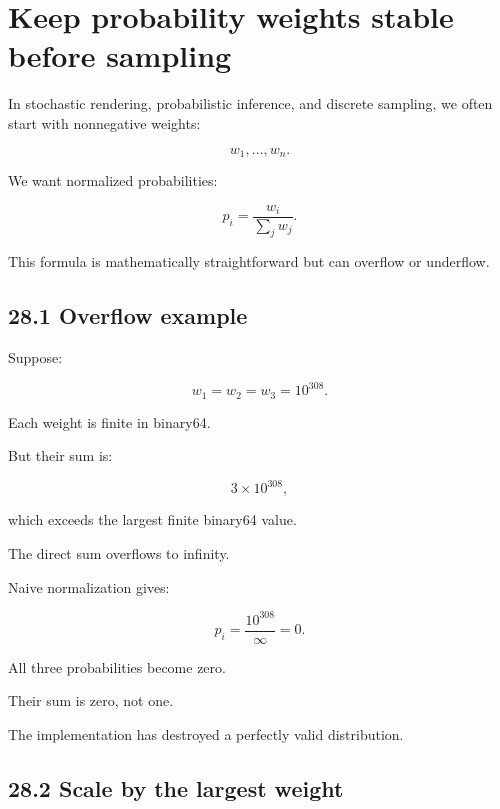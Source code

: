 \section{Keep probability weights stable before sampling}\label{02-foundations-ii-ch031-keep-probability-weights-stable-before-sampling}

\hypertarget{02-foundations-ii-ch031-keep-probability-weights-stable-before-sampling}{}

In stochastic rendering, probabilistic inference, and discrete sampling, we often start with nonnegative weights:

\[ w_1,\ldots,w_n. \]

We want normalized probabilities:

\[ \boxed{ p_i=\frac{w_i}{\sum_jw_j} }. \]

This formula is mathematically straightforward but can overflow or underflow.

\subsection{28.1 Overflow example}\label{02-foundations-ii-ch031-overflow-example}

\hypertarget{02-foundations-ii-ch031-overflow-example}{}

Suppose:

\[ w_1=w_2=w_3=10^{308}. \]

Each weight is finite in binary64.

But their sum is:

\[ 3\times10^{308}, \]

which exceeds the largest finite binary64 value.

The direct sum overflows to infinity.

Naive normalization gives:

\[ p_i=\frac{10^{308}}{\infty}=0. \]

All three probabilities become zero.

Their sum is zero, not one.

The implementation has destroyed a perfectly valid distribution.

\subsection{28.2 Scale by the largest weight}\label{02-foundations-ii-ch031-scale-by-the-largest-weight}

\hypertarget{02-foundations-ii-ch031-scale-by-the-largest-weight}{}

